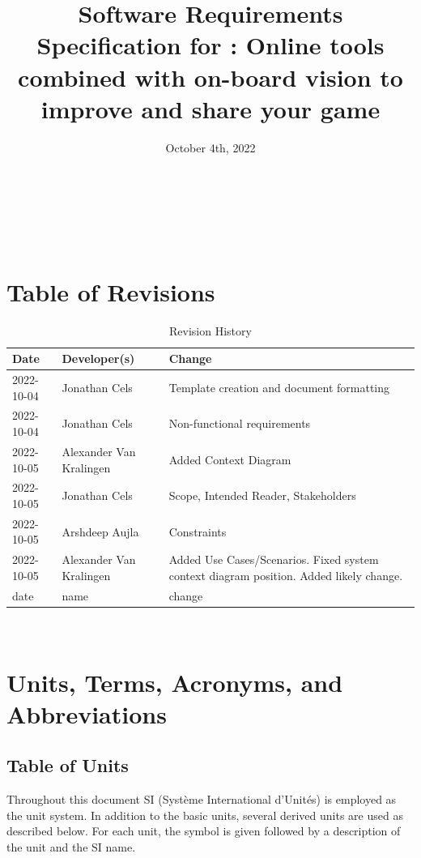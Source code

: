 \documentclass[12pt]{article}
\begin{document}
\title{Software Requirements Specification for \progname{}: Online tools combined with on-board vision to improve and share your game} 
\author{\authname}
\date{October 4th, 2022}
	
\maketitle

~\newpage

\tableofcontents

~\newpage

\section*{Table of Revisions}
\begin{table}[hp]
\caption{Revision History} \label{TblRevisionHistory}
\begin{tabularx}{\textwidth}{llX}
\toprule
\textbf{Date} & \textbf{Developer(s)} & \textbf{Change}\\
\midrule
2022-10-04 & Jonathan Cels & Template creation and document formatting\\ 
2022-10-04 & Jonathan Cels & Non-functional requirements\\
2022-10-05 & Alexander Van Kralingen & Added Context Diagram\\
2022-10-05 & Jonathan Cels & Scope, Intended Reader, Stakeholders\\
2022-10-05 & Arshdeep Aujla & Constraints\\
2022-10-05 & Alexander Van Kralingen & Added Use Cases/Scenarios. Fixed system context diagram position. Added likely change.\\
date & name & change\\
\bottomrule
\end{tabularx}
\end{table}

~\newpage

\section{Units, Terms, Acronyms, and Abbreviations}

\subsection{Table of Units}
Throughout this document SI (Syst\`{e}me International d'Unit\'{e}s) is employed
as the unit system.  In addition to the basic units, several derived units are
used as described below.  For each unit, the symbol is given followed by a
description of the unit and the SI name.
\end{document}
